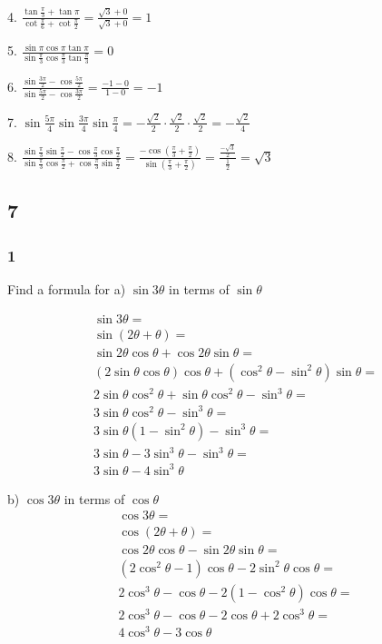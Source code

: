 \documentclass[]{report}
\begin{document}
4.
$\frac{\tan\frac{\pi}{3} + \tan\pi}{\cot \frac{\pi}{6} + \cot\frac{\pi}{2}} = \frac{\sqrt{3} + 0}{\sqrt{3} +0} =  1$

5.
$\frac{\sin\pi\cos\pi\tan\pi}{\sin\frac{\pi}{3}\cos\frac{\pi}{3}\tan\frac{\pi}{3}} = 0$

6. $\frac{\sin \frac{3\pi}{2} - \cos \frac{5\pi}{2} }{\sin \frac{5\pi}{2} - \cos \frac{3\pi}{2}} = \frac{-1 - 0}{1 - 0} = -1$

7. $\sin \frac{5\pi}{4} \sin \frac{3\pi}{4} \sin\frac{\pi}{4} = -\frac{\sqrt{2}}{2} \cdot \frac{\sqrt{2}}{2} \cdot \frac{\sqrt{2}}{2} = -\frac{\sqrt{2}}{4} $

8. $\frac{\sin \frac{\pi}{3} \sin \frac{\pi}{2}  - \cos \frac{\pi}{3} \cos \frac{\pi}{2}}{\sin \frac{\pi}{3} \cos \frac{\pi}{2}  + \cos \frac{\pi}{3} \sin\frac{\pi}{2}} = \frac{-\cos (\frac{\pi}{3} +\frac{\pi}{2})  }{\sin (\frac{\pi}{3} +\frac{\pi}{2})} = \frac{\frac{-\sqrt{3}}{2}}{\frac{1}{2}} = \sqrt{3}$

\subsection{7}

\subsubsection{1}
Find a formula for 
a) $\sin3\theta$ in terms of $\sin \theta$

\begin{align*}
\sin 3 \theta =\\
\sin(2\theta + \theta) = \\
\sin2\theta\cos\theta + \cos2\theta\sin\theta = \\
(2\sin\theta\cos\theta)\cos\theta + (\cos^2\theta - \sin^2\theta)\sin\theta = \\
2\sin\theta\cos^2\theta + \sin\theta\cos^2\theta - \sin^3\theta  = \\
3\sin\theta\cos^2\theta - \sin^3\theta = \\
3\sin\theta(1 - \sin^2\theta) - \sin^3\theta = \\
3\sin\theta - 3\sin^3\theta - \sin^3\theta = \\
3\sin\theta - 4\sin^3\theta
\end{align*}

b) $\cos3\theta$ in terms of $\cos \theta$
\begin{align*}
\cos3\theta = \\
\cos(2\theta + \theta) = \\
\cos 2\theta\cos\theta - \sin2\theta\sin\theta = \\
(2\cos^2\theta - 1)\cos\theta - 2\sin^2\theta\cos\theta = \\
2\cos^3\theta - \cos\theta - 2(1 - \cos^2\theta)\cos\theta = \\
2\cos^3\theta - \cos\theta - 2\cos\theta + 2\cos^3\theta = \\
4\cos^3\theta - 3\cos\theta
\end{align*}
\end{document}
